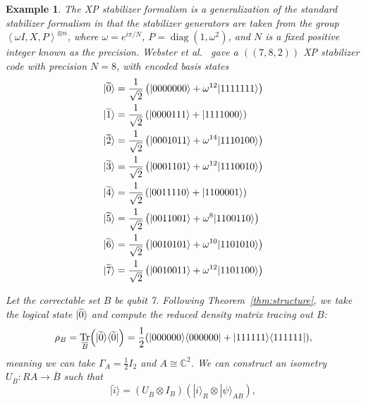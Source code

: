 \documentclass[]{amsart}
\DeclarePairedDelimiter\bra{\langle}{\rvert}
\DeclarePairedDelimiter\ket{\lvert}{\rangle}
\DeclareMathOperator{\Tr}{Tr}
\DeclareMathOperator{\diag}{diag}
\newtheorem{example}[theorem]{Example}
\begin{document}

\begin{example}\label{ex:eaxp7}
The XP stabilizer formalism is a generalization of the standard stabilizer formalism in that the stabilizer generators are taken from the group $\left\langle \omega I,X,P\right\rangle^{\otimes n}$, where $\omega=e^{i\pi/N}$, $P=\diag\!\left(1,\omega^2\right)$, and $N$ is a fixed positive integer known as the precision. Webster et al.~\cite[Example 6.3]{WBB2022} gave a $\left(\!\left(7,8,2\right)\!\right)$ XP stabilizer code with precision $N=8$, with encoded basis states
\begin{align*}
    \ket{\widetilde{0}} & = \frac{1}{\sqrt{2}}\left(\ket{0000000}+\omega^{12}\ket{1111111}\right) \\
    \ket{\widetilde{1}} & = \frac{1}{\sqrt{2}}\left(\ket{0000111}+\ket{1111000}\right) \\
    \ket{\widetilde{2}} & = \frac{1}{\sqrt{2}}\left(\ket{0001011}+\omega^{14}\ket{1110100}\right) \\
    \ket{\widetilde{3}} & = \frac{1}{\sqrt{2}}\left(\ket{0001101}+\omega^{12}\ket{1110010}\right) \\
    \ket{\widetilde{4}} & = \frac{1}{\sqrt{2}}\left(\ket{0011110}+\ket{1100001}\right) \\
    \ket{\widetilde{5}} & = \frac{1}{\sqrt{2}}\left(\ket{0011001}+\omega^{8}\ket{1100110}\right) \\
    \ket{\widetilde{6}} & = \frac{1}{\sqrt{2}}\left(\ket{0010101}+\omega^{10}\ket{1101010}\right) \\
    \ket{\widetilde{7}} & = \frac{1}{\sqrt{2}}\left(\ket{0010011}+\omega^{12}\ket{1101100}\right) 
\end{align*}

Let the correctable set $B$ be qubit 7. Following Theorem~\ref{thm:structure}, we take the logical state $\ket{\widetilde{0}}$ and compute the reduced density matrix tracing out $B$:
\begin{equation}
    \rho_B = \Tr_{\overline{B}}\!\left(\ket{\widetilde{0}} \bra{\widetilde{0}}\right) = \frac{1}{2}(\ket{000000}\bra{000000} + \ket{111111}\bra{111111}),
\end{equation}
meaning we can take $\Gamma_A = \frac{1}{2} I_2$ and $A \cong \mathbb{C}^2$.
We can construct an isometry $U_{\overline{B}}: R A \to \overline{B}$ such that
\begin{equation}
    |\tilde{i}\rangle = (U_{\overline{B}} \otimes I_B)(|i\rangle_R \otimes |\psi\rangle_{AB}),
\end{equation}


\end{example}
\end{document}
